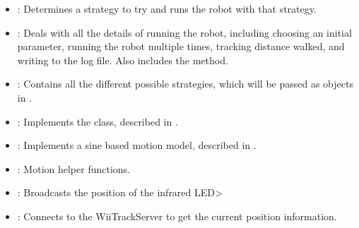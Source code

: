 \begin{itemize}
\item {}: Determines a strategy to try and runs the robot
  with that strategy.
\item {}: Deals with all the details of running the robot,
  including choosing an initial parameter, running the robot multiple times, 
  tracking distance walked, and writing to the log file. Also includes the
   method.
\item {}: Contains all the different possible strategies, which
  will be passed as objects in . 
\item {}: Implements the  class, described in
  .
\item {}: Implements a sine based motion model,
  described in .
\item {}: Motion helper functions.
\item {}: Broadcasts the position of the infrared LED>
\item {}: Connects to the WiiTrackServer to get the current position information.
\end{itemize}
